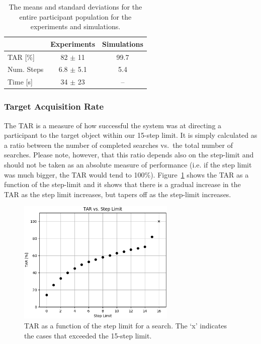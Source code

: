\documentclass[a4paper, twoside]{article}
\begin{document}
\begin{table}[b]                      
  \centering                       
  \caption{The means and standard deviations for the entire participant population for the experiments and simulations.}\label{tab:results-summary}
  \begin{tabular}{lcc}
    \toprule
     & Experiments & Simulations \\ \midrule
    TAR [\%] & 82 $\pm$ 11 & 99.7 \\ \midrule
    Num. Steps & 6.8 $\pm$ 5.1 & 5.4 \\ \midrule
    Time [s] & 34 $\pm$ 23 & --  \\ \midrule
    \bottomrule
  \end{tabular}
\end{table}

\subsubsection{Target Acquisition Rate}

\noindent The TAR is a measure of how successful the system was at directing a participant to the target object within our 15-step limit. It is simply calculated as a ratio between the number of completed searches vs.\ the total number of searches. Please note, however, that this ratio depends also on the step-limit and should not be taken as an absolute measure of performance (i.e. if the step limit was much bigger, the TAR would tend to 100\%). Figure~\ref{fig:tar-steps} shows the TAR as a function of the step-limit and it shows that there is a gradual increase in the TAR as the step limit increases, but tapers off as the step-limit increases.

\begin{figure}[b]
  \centering
  \includegraphics[height=5.9cm]{figures/cdf_tar_limit.png}
  \caption{TAR as a function of the step limit for a search. The `x' indicates the cases that exceeded the 15-step limit. }\label{fig:tar-steps}
\end{figure}
\end{document}
